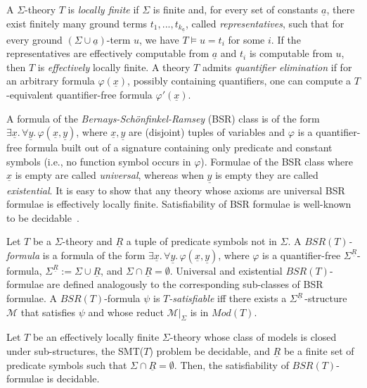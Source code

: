 \documentclass[conference]{llncs}
\begin{document}
{A $\Sigma$-theory $T$ is \emph{locally finite} if $\Sigma$ is finite
and, for every set of constants $\underline{a}$, there exist finitely
many ground terms $t_1, ..., t_{k_{\underline{a}}}$, called
\emph{representatives}, such that for every ground $(\Sigma\cup
\underline{a})$-term $u$, we have $T\models u = t_i$ for some $i$. If
the representatives are effectively computable from $\underline{a}$
and $t_i$ is computable from $u$, then $T$ is \emph{effectively}
locally finite. 
A theory $T$ admits \emph{quantifier elimination} if for an arbitrary formula $\varphi(\underline{x})$,
possibly containing quantifiers, one can compute a $T$-equivalent
quantifier-free formula $\varphi'(\underline{x})$.

A formula of the \emph{Bernays-Sch{\"o}nfinkel-Ramsey} (BSR) class is of
the form $\exists \underline{x}.\, \forall \underline{y}.\,
\varphi(\underline{x}, \underline{y})$, where $\underline{x},
\underline{y}$ are (disjoint) tuples of variables and $\varphi$ is a
quantifier-free formula built out of a signature containing only
predicate and constant symbols (i.e., no function symbol occurs in
$\varphi$). Formulae of the BSR class where $\underline{x}$ is empty are
called \emph{universal}, whereas when $\underline{y}$ is empty they are
called \emph{existential}. It is easy to show that any theory whose
axioms are universal BSR formulae is effectively locally finite. Satisfiability of
BSR formulae is well-known to be decidable~\cite{ramsey}.

Let $T$ be a $\Sigma$-theory and $\underline{R}$ a tuple of predicate
symbols not in $\Sigma$. A \emph{$\mathit{BSR}(T)$-formula} is a formula
of the form $\exists \underline{x}.\,\forall \underline{y}.\,
\varphi(\underline{x}, \underline{y})$, where $\varphi$ is a
quantifier-free $\Sigma^{\underline{R}}$-formula,
$\Sigma^{\underline{R}}:=\Sigma \cup \underline{R}$, and $\Sigma \cap
\underline{R}=\emptyset$. Universal and existential
$\mathit{BSR}(T)$-formulae are defined analogously to the corresponding
sub-classes of BSR formulae. A $\mathit{BSR}(T)$-formula $\psi$ is
\emph{$T$-satisfiable} iff there exists a
$\Sigma^{\underline{R}}$\,-structure $\mathcal{M}$ that satisfies $\psi$
and whose reduct $\mathcal{M}|_{\Sigma}$ is in $\mathit{Mod}(T)$.

\begin{theorem}
  \label{th:dec-ext-BSR}
  Let $T$ be an effectively locally finite $\Sigma$-theory whose class of models is
  closed under sub-structures, the SMT($T$) problem be decidable, and
  $\underline{R}$ be a finite set of predicate symbols such that
  $\Sigma \cap \underline{R} = \emptyset$.  Then, the satisfiability
  of $\mathit{BSR}(T)$-formulae is decidable.
\end{theorem}

}
\end{document}

